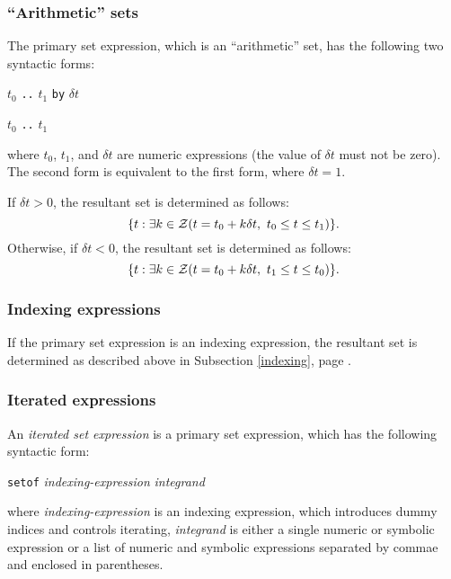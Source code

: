 \documentclass[10pt]{article}
\begin{document}
\subsubsection{``Arithmetic'' sets}

The primary set expression, which is an ``arithmetic'' set, has the
following two syntactic forms:

\medskip

\noindent\hfil
$t_0$ {\tt..} $t_1$ {\tt by} $\delta t$

\medskip

\noindent\hspace{138.5pt}
$t_0$ {\tt..} $t_1$

\medskip

\noindent where $t_0$, $t_1$, and $\delta t$ are numeric expressions
(the value of $\delta t$ must not be zero). The second form is
equivalent to the first form, where $\delta t=1$.

If $\delta t>0$, the resultant set is determined as follows:
$$\{t:\exists k\in{\cal Z}(t=t_0+k\delta t,\ t_0\leq t\leq t_1)\}.$$
Otherwise, if $\delta t<0$, the resultant set is determined as follows:
$$\{t:\exists k\in{\cal Z}(t=t_0+k\delta t,\ t_1\leq t\leq t_0)\}.$$

\subsubsection{Indexing expressions}

If the primary set expression is an indexing expression, the resultant
set is determined as described above in Subsection \ref{indexing}, page
\pageref{indexing}.

\subsubsection{Iterated expressions}

An {\it iterated set expression} is a primary set expression, which has
the following syntactic form:

\medskip

\noindent\hfil
{\tt setof} {\it indexing-expression} {\it integrand}

\medskip

\noindent where {\it indexing-expression} is an indexing expression,
which introduces dummy indices and controls iterating, {\it integrand}
is either a single numeric or symbolic expression or a list of numeric
and symbolic expressions separated by commae and enclosed in
parentheses.
\end{document}
